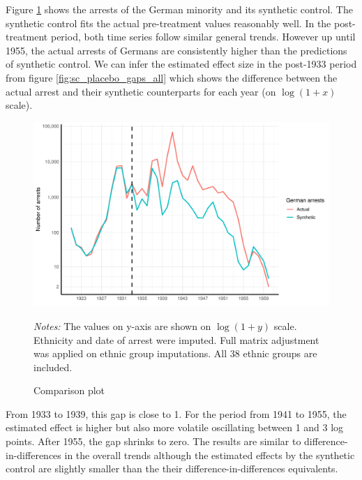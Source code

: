 %


Figure \ref{fig:sc_comp_plot} shows the  arrests of the German minority and its synthetic control.
The synthetic control fits the actual pre-treatment values reasonably well. 
In the post-treatment period, both time series follow similar general trends. 
However up until 1955, the actual arrests of Germans are consistently higher than the predictions of  synthetic control. %
We can infer the estimated effect size in the post-1933 period  from figure  \ref{fig:sc_placebo_gaps_all} which shows the difference between the actual arrest and their synthetic counterparts for each year (on $\log(1 + x)$ scale). 

 \begin{figure}[h]
\centering
\caption{Comparison plot}
\includegraphics[width=\textwidth]{plots/synthetic_control/ethnicity_imputation/annual/comparison_plot_scaled.pdf}
\begin{minipage}{0.92\textwidth}
\footnotesize
\emph{Notes:} The values on y-axis are shown on $\log\left(1 + y\right)$ scale.  Ethnicity and date of arrest were imputed.  Full matrix adjustment was applied on ethnic group imputations. All 38 ethnic groups are included. 
\end{minipage}
\label{fig:sc_comp_plot}
\end{figure}


From 1933 to 1939, this gap is close to 1. For the period from 1941 to 1955, the estimated effect is higher but also more volatile oscillating between 1 and 3 log points.
After 1955, the gap shrinks to zero. 
The results are similar to difference-in-differences in the overall trends although the estimated effects by   the synthetic control  are slightly smaller than the their difference-in-differences equivalents.  

